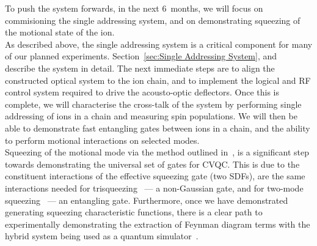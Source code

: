     To push the system forwards, in the next 6~months, we will focus on
    commisioning the single addressing system, and on demonstrating squeezing of
    the motional state of the ion.\\
    As described above, the single addressing system is a critical component for
    many of our planned experiments. Section~\ref{sec:Single Addressing System},
    and~\cite{oevergaard2024limiting} describe the system in detail. The next
    immediate steps are to align the constructed optical system to the ion
    chain, and to implement the logical and RF control system required to drive
    the acousto-optic deflectors. Once this is complete, we will characterise
    the cross-talk of the system by performing single addressing of ions in a
    chain and measuring spin populations. We will then be able to demonstrate
    fast entangling gates between ions in a chain, and the ability to perform
    motional interactions on selected modes.\\
    Squeezing of the motional mode via the method outlined
    in~\cite{sutherland2021universal}, is a significant step towards
    demonstrating the universal set of gates for CVQC. This is due to
    the constituent interactions of the effective squeezing gate (two SDFs), are
    the same interactions needed for trisqueezing~\cite{braunstein1987generalised, bazavan2024squeezing} --- a non-Gaussian gate, and
    for two-mode squeezing~\cite{lvovsky2015squeezed} --- an entangling gate. Furthermore, once we have
    demonstrated generating squeezing characteristic functions, there is a clear
    path to experimentally demonstrating the extraction of Feynman diagram terms
    with the hybrid system being used as a quantum
    simulator~\cite{varona2024towards}.\\
